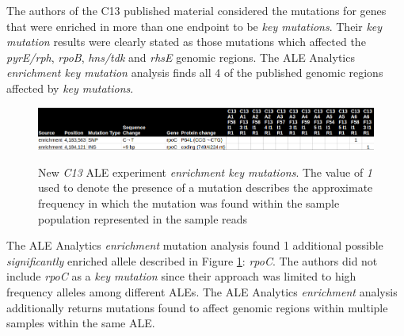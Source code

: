 \documentclass[12pt,final,masters,chapterheads]{ucsd}  %
\begin{document}
The authors of the C13 published material considered the mutations for genes that were enriched in more than one endpoint to be \textit{key mutations}. Their \textit{key mutation} results were clearly stated as those mutations which affected the \textit{pyrE/rph}, \textit{rpoB}, \textit{hns/tdk} and \textit{rhsE} genomic regions. The ALE Analytics \textit{enrichment key mutation} analysis finds all 4 of the published genomic regions affected by \textit{key mutations}.
\begin{figure}[H]
  \caption{New \textit{C13} ALE experiment \textit{enrichment key mutations}. The value of \textit{1} used to denote the presence of a mutation describes the approximate frequency in which the mutation was found within the sample population represented in the sample reads \cite{breseq_paper}}
  \centering
  \includegraphics[width=\textwidth]{c13_new_enrich_muts.png}
  \label{fig:c13_new_enrich_muts}
\end{figure}
The ALE Analytics \textit{enrichment} mutation analysis found 1 additional possible \textit{significantly} enriched allele described in Figure \ref{fig:c13_new_enrich_muts}: \textit{rpoC}. The authors did not include \textit{rpoC} as a \textit{key mutation} since their approach was limited to high frequency alleles among different ALEs. The ALE Analytics \textit{enrichment} analysis additionally returns mutations found to affect genomic regions within multiple samples within the same ALE.
\end{document}
